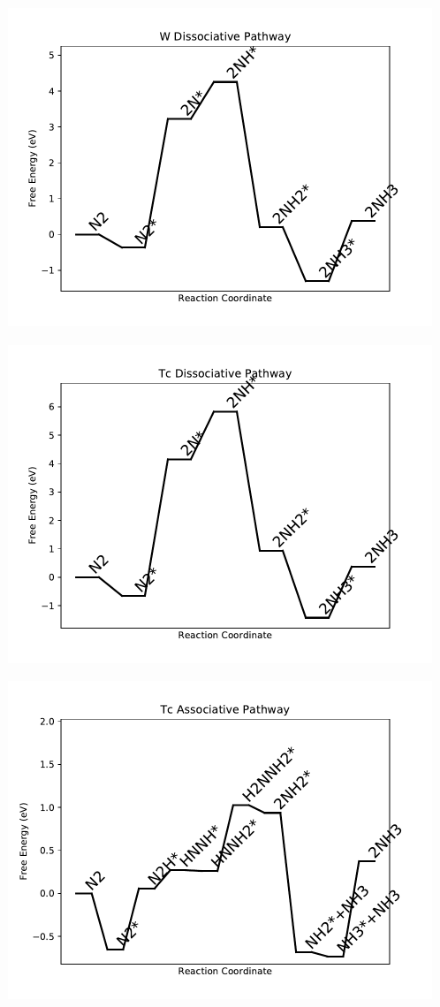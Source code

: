 \begin{figure}
\centering
\includegraphics[width=0.8\linewidth]{data/plots/W_dissociative.pdf}
\end{figure}

\begin{figure}
\centering
\includegraphics[width=0.8\linewidth]{data/plots/Tc_dissociative.pdf}
\end{figure}

\begin{figure}
\centering
\includegraphics[width=0.8\linewidth]{data/plots/Tc_associative.pdf}
\end{figure}

